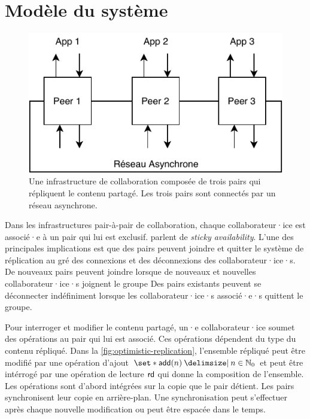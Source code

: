 

\section{Modèle du système}

\begin{figure}[htb]
\centering
\includegraphics{fig/impl.pdf}
\caption[Modèle du système]{Une infrastructure de collaboration composée de trois pairs qui répliquent le contenu partagé. Les trois pairs sont connectés par un réseau asynchrone.}\label{fig:collab-system}
\end{figure}

Dans les infrastructures pair-à-pair de collaboration, chaque collaborateur·ice est associé·e à un pair qui lui est exclusif.
\textcite{guerraoui_2016_tradeoffs-replication} parlent de \emph{sticky availability}.
L'une des principales implications est que des pairs peuvent joindre et quitter le système de réplication au gré des connexions et des déconnexions des collaborateur·ice·s.
De nouveaux pairs peuvent joindre lorsque de nouveaux et nouvelles collaborateur·ice·s joignent le groupe
Des pairs existants peuvent se déconnecter indéfiniment lorsque les collaborateur·ice·s associé·e·s quittent le groupe.

Pour interroger et modifier le contenu partagé, un·e collaborateur·ice soumet des opérations au pair qui lui est associé.
Ces opérations dépendent du type du contenu répliqué.
Dans la \autoref{fig:optimistic-replication}, l'ensemble répliqué peut être modifié par une opération d'ajout $\set*{\trm{add}(n) \given n \in \mathbb{N}_0}$ et peut être intérrogé par une opération de lecture $\operatorname{\mathsf{rd}}$ qui donne la composition de l'ensemble.
Les opérations sont d'abord intégrées sur la copie que le pair détient.
Les pairs synchronisent leur copie en arrière-plan.
Une synchronisation peut s'effectuer après chaque nouvelle modification ou peut être espacée dans le temps.

